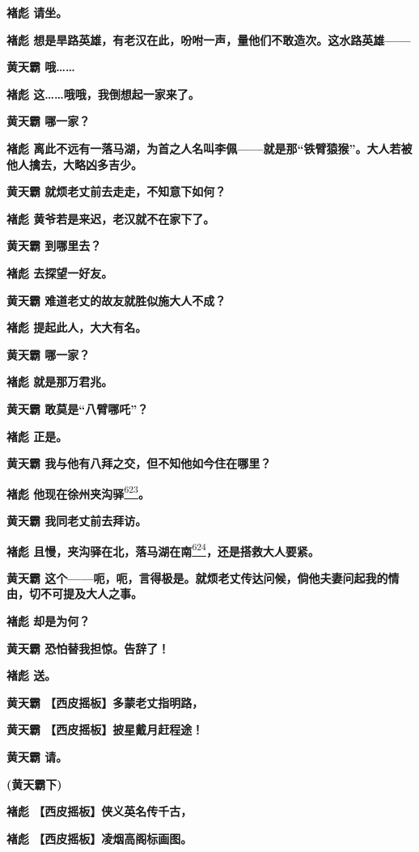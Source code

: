 \textbf{褚彪 请坐。}

\textbf{褚彪
想是旱路英雄，有老汉在此，吩咐一声，量他们不敢造次。这水路英雄------}

\textbf{黄天霸 哦\ldots{}\ldots{}}

\textbf{褚彪 这\ldots{}\ldots{}哦哦，我倒想起一家来了。}

\textbf{黄天霸 哪一家？}

\textbf{褚彪
离此不远有一落马湖，为首之人名叫李佩------就是那``铁臂猿猴''。大人若被他人擒去，大略凶多吉少。}

\textbf{黄天霸 就烦老丈前去走走，不知意下如何？}

\textbf{褚彪 黄爷若是来迟，老汉就不在家下了。}

\textbf{黄天霸 到哪里去？}

\textbf{褚彪 去探望一好友。}

\textbf{黄天霸 难道老丈的故友就胜似施大人不成？}

\textbf{褚彪 提起此人，大大有名。}

\textbf{黄天霸 哪一家？}

\textbf{褚彪 就是那万君兆。}

\textbf{黄天霸 敢莫是``八臂哪吒''？}

\textbf{褚彪 正是。}

\textbf{黄天霸 我与他有八拜之交，但不知他如今住在哪里？}

\textbf{褚彪
他现在徐州夹沟驿}\protect\hyperlink{fn623}{\textsuperscript{623}}\textbf{。}

\textbf{黄天霸 我同老丈前去拜访。}

\textbf{褚彪
且慢，夹沟驿在北，落马湖在南}\protect\hyperlink{fn624}{\textsuperscript{624}}\textbf{，还是搭救大人要紧。}

\textbf{黄天霸
这个------呃，呃，言得极是。就烦老丈传达问候，倘他夫妻问起我的情由，切不可提及大人之事。}

\textbf{褚彪 却是为何？}

\textbf{黄天霸 恐怕替我担惊。告辞了！}

\textbf{褚彪 送。}

\textbf{黄天霸 【西皮摇板】多蒙老丈指明路，}

\textbf{黄天霸 【西皮摇板】披星戴月赶程途！}

\textbf{黄天霸 请。}

\textbf{(黄天霸下)}

\textbf{褚彪 【西皮摇板】侠义英名传千古，}

\textbf{褚彪 【西皮摇板】凌烟高阁标画图。}

